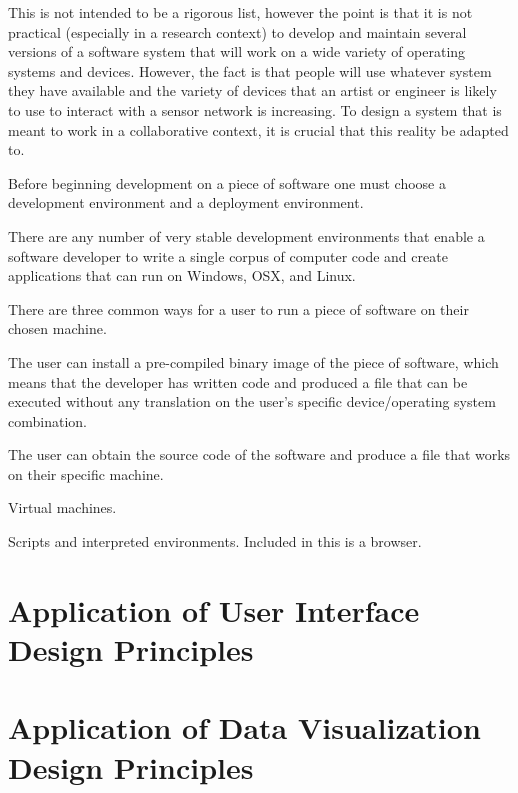 This is not intended to be a rigorous list, however the point is that it is not practical (especially in a research context) to develop and maintain several versions of a software system that will work on a wide variety of operating systems and devices. However, the fact is that people will use whatever system they have available and the variety of devices that an artist or engineer is likely to use to interact with a sensor network is increasing. To design a system that is meant to work in a collaborative context, it is crucial that this reality be adapted to.

Before beginning development on a piece of software one must choose a development environment and a deployment environment.

There are any number of very stable development environments that enable a software developer to write a single corpus of computer code and create applications that can run on Windows, OSX, and Linux.

There are three common ways for a user to run a piece of software on their chosen machine.

The user can install a pre-compiled binary image of the piece of software, which means that the developer has written code and produced a file that can be executed without any translation on the user's specific device/operating system combination.

The user can obtain the source code of the software and produce a file that works on their specific machine.

Virtual machines.

Scripts and interpreted environments. Included in this is a browser.

\section{Application of User Interface Design Principles}

\section{Application of Data Visualization Design Principles}
